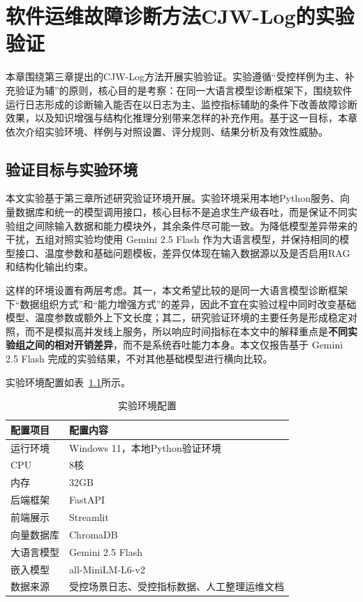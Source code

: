 \chapter{软件运维故障诊断方法CJW-Log的实验验证}

本章围绕第三章提出的CJW-Log方法开展实验验证。实验遵循“受控样例为主、补充验证为辅”的原则，核心目的是考察：在同一大语言模型诊断框架下，围绕软件运行日志形成的诊断输入能否在以日志为主、监控指标辅助的条件下改善故障诊断效果，以及知识增强与结构化推理分别带来怎样的补充作用。基于这一目标，本章依次介绍实验环境、样例与对照设置、评分规则、结果分析及有效性威胁。

\section{验证目标与实验环境}

本文实验基于第三章所述研究验证环境开展。实验环境采用本地Python服务、向量数据库和统一的模型调用接口，核心目标不是追求生产级吞吐，而是保证不同实验组之间除输入数据和能力模块外，其余条件尽可能一致。为降低模型差异带来的干扰，五组对照实验均使用 Gemini 2.5 Flash 作为大语言模型，并保持相同的模型接口、温度参数和基础问题模板，差异仅体现在输入数据源以及是否启用RAG和结构化输出约束。

这样的环境设置有两层考虑。其一，本文希望比较的是同一大语言模型诊断框架下“数据组织方式”和“能力增强方式”的差异，因此不宜在实验过程中同时改变基础模型、温度参数或额外上下文长度；其二，研究验证环境的主要任务是形成稳定对照，而不是模拟高并发线上服务，所以响应时间指标在本文中的解释重点是\textbf{不同实验组之间的相对开销差异}，而不是系统吞吐能力本身。本文仅报告基于 Gemini 2.5 Flash 完成的实验结果，不对其他基础模型进行横向比较。

实验环境配置如表~\ref{tab:experiment-env}所示。

\begin{table}[htbp]
\centering
\caption{实验环境配置}
\label{tab:experiment-env}
\small
\setlength{\tabcolsep}{5pt}
\renewcommand{\arraystretch}{1.12}
\begin{tabular}{ll}
\toprule
配置项目 & 配置内容 \\
\midrule
运行环境 & Windows 11，本地Python验证环境 \\
CPU & 8核 \\
内存 & 32GB \\
后端框架 & FastAPI \\
前端展示 & Streamlit \\
向量数据库 & ChromaDB \\
大语言模型 & Gemini 2.5 Flash \\
嵌入模型 & all-MiniLM-L6-v2 \\
数据来源 & 受控场景日志、受控指标数据、人工整理运维文档 \\
\bottomrule
\end{tabular}
\end{table}

